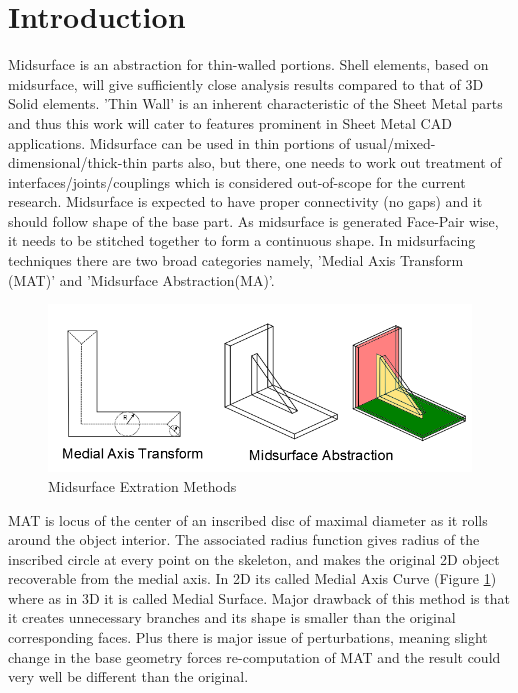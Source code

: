 \section{Introduction}

Midsurface is an abstraction for thin-walled portions. Shell elements, based on midsurface, will give sufficiently close analysis results compared to that of 3D Solid elements. 'Thin Wall' is an inherent characteristic of the Sheet Metal parts and thus this work will cater to features prominent in Sheet Metal CAD applications. Midsurface can be used in thin portions of usual/mixed-dimensional/thick-thin parts also, but there, one needs to work out treatment of interfaces/joints/couplings which is considered out-of-scope for the current research. Midsurface is expected to have proper connectivity  (no gaps) and it should follow shape of the base part. As midsurface is generated Face-Pair wise, it needs to be stitched together to form a continuous shape. In midsurfacing techniques there are two broad categories namely, 'Medial Axis Transform (MAT)' and 'Midsurface Abstraction(MA)'.

	\begin{figure}[h]
	\centering
	\includegraphics[width=0.8\linewidth]{../Common/images//MAT_Midsurf.png}
	\caption{Midsurface Extration Methods}
	\label{MATMidsurf}
	\end{figure}
	
	
MAT is locus of the center of an inscribed disc of maximal diameter as it rolls around the object interior. The associated radius function gives radius of the inscribed circle at every point on the skeleton, and makes the original 2D object recoverable from the medial axis. In 2D its called Medial Axis Curve (Figure \ref{MATMidsurf}) where as in 3D it is called Medial Surface. Major drawback of this method is that it creates unnecessary branches and its shape is smaller than the original corresponding faces. Plus there is major issue of perturbations, meaning slight change in the base geometry forces re-computation of MAT and the result could very well be different than the original. 

